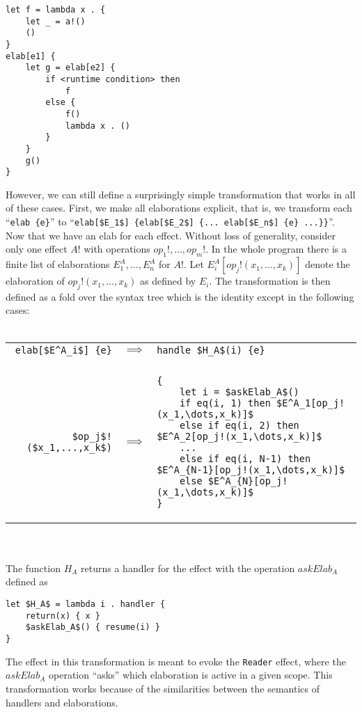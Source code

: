 \documentclass{article}
\begin{document}
\begin{lstlisting}
let f = lambda x . {
    let _ = a!()
    ()
}
elab[e1] {
    let g = elab[e2] {
        if <runtime condition> then
            f
        else {
            f()
            lambda x . ()
        }
    }
    g()
}
\end{lstlisting}

However, we can still define a surprisingly simple transformation that works in all of these cases. First, we make all elaborations explicit, that is, we transform each ``\lstinline|elab {e}|'' to ``\lstinline|elab[$E_1$] {elab[$E_2$] {... elab[$E_n$] {e} ...}}|''. Now that we have an elab for each effect. Without loss of generality, consider only one effect $A!$ with operations $op_1!,\dots,op_m!$. In the whole program there is a finite list of elaborations $E^A_1,\dots,E^A_n$ for $A!$. Let $E^A_i[op_j!(x_1,\dots,x_k)]$ denote the elaboration of $op_j!(x_1,\dots,x_k)$ as defined by $E_i$. The transformation is then defined as a fold over the syntax tree which is the identity except in the following cases:
\\\\
\begin{tabular}{rcl}
\lstinline|elab[$E^A_i$] {e}|
& $\implies$
& \lstinline|handle $H_A$(i) {e}|
\\\\
\lstinline|$op_j$!($x_1,...,x_k$)|
& $\implies$
& \begin{lstlisting}
{
    let i = $askElab_A$()
    if eq(i, 1) then $E^A_1[op_j!(x_1,\dots,x_k)]$
    else if eq(i, 2) then $E^A_2[op_j!(x_1,\dots,x_k)]$
    ...
    else if eq(i, N-1) then $E^A_{N-1}[op_j!(x_1,\dots,x_k)]$
    else $E^A_{N}[op_j!(x_1,\dots,x_k)]$
}
\end{lstlisting} \\
\end{tabular}
\\\\
The function $H_A$ returns a handler for the effect with the operation $askElab_A$ defined as

\begin{lstlisting}
let $H_A$ = lambda i . handler {
    return(x) { x }
    $askElab_A$() { resume(i) }
}
\end{lstlisting}

The effect in this transformation is meant to evoke the \texttt{Reader} effect, where the $askElab_A$ operation ``asks'' which elaboration is active in a given scope. This transformation works because of the similarities between the semantics of handlers and elaborations.
\end{document}
